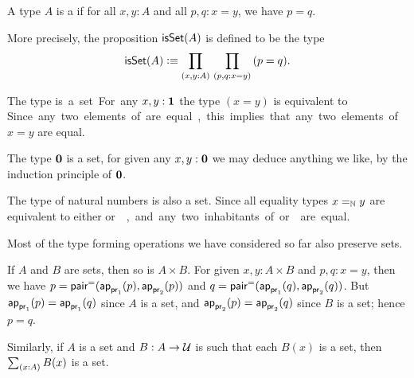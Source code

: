\documentclass[hott-all.tex]{subfiles}
\begin{document}
\begin{defn}\label{defn:set}
  A type $A$ is a 
  if for all $x,y:A$ and all $p,q:x=y$, we have $p=q$.
\end{defn}

More precisely, the proposition $\isset(A)$ is defined to be the type
\[ \isset(A) \defeq \prd{x,y:A}{p,q:x=y} (p=q). \]
%
%

\begin{eg}\label{eg:isset-unit}
  The type \unit is a set.
  For any $x,y:\unit$ the type $(x=y)$ is equivalent to \unit.
  Since any two elements of \unit are equal, this implies that any two elements of $x=y$ are equal.
\end{eg}

\begin{eg}\label{eg:isset-empty}
  The type $\emptyt$ is a set, for given any $x,y:\emptyt$ we may deduce anything we like, by the induction principle of $\emptyt$.
\end{eg}

\begin{eg}\label{thm:nat-set}
  The type \nat of natural numbers is also a set.
  Since all equality types $\id[\nat]xy$ are equivalent to either \unit or \emptyt, and any two inhabitants of \unit or \emptyt are equal.
\end{eg}

Most of the type forming operations we have considered so far also preserve sets.

\begin{eg}\label{thm:isset-prod}
  If $A$ and $B$ are sets, then so is $A\times B$.
  For given $x,y:A\times B$ and $p,q:x=y$, then
  we have $p= \pairpath(\projpath1(p),\projpath2(p))$ and $q= \pairpath(\projpath1(q),\projpath2(q))$.
  But $\projpath1(p)=\projpath1(q)$ since $A$ is a set, and $\projpath2(p)=\projpath2(q)$ since $B$ is a set; hence $p=q$.

  Similarly, if $A$ is a set and $B:A\to\type$ is such that each $B(x)$ is a set, then $\sm{x:A} B(x)$ is a set.
\end{eg}
\end{document}
